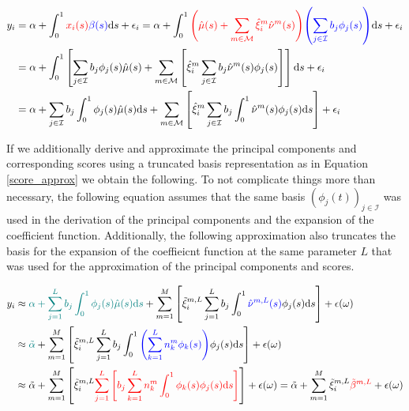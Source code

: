 \documentclass[11pt,twoside,a4paper]{article}
\begin{document}
	\begin{equation}
		\begin{split}
			y_i &= \alpha + \int_{0}^{1} {\color{red}x_i(s)} {\color{blue}\beta(s)} \mathrm{d}s + \epsilon_i
			= \alpha + \int_{0}^{1} {\color{red}\left(\hat{\mu}(s) + \sum_{m \in \mathcal{M}} \hat{\xi}^{m}_i \hat{\nu}^{m}(s)\right)} {\color{blue}\left(\sum_{j \in \mathcal{I}} b_j \phi_j(s)\right)} \mathrm{d}s + \epsilon_i\\
			&= \alpha + \int_{0}^{1} \left[ \sum_{j \in \mathcal{I}} b_j \phi_j(s) \hat{\mu}(s) + \sum_{m \in \mathcal{M}} \left[ \hat{\xi}^m_i \sum_{j \in \mathcal{I}} b_j \hat{\nu}^m(s) \phi_j(s) \right] \right] \mathrm{d}s + \epsilon_i \\
			&= \alpha + \sum_{j \in \mathcal{I}} b_j \int_{0}^{1} \phi_j(s) \hat{\mu}(s) \mathrm{d}s + \sum_{m \in \mathcal{M}} \left[ \hat{\xi}^m_i \sum_{j \in \mathcal{I}} b_j \int_{0}^{1}\hat{\nu}^m(s) \phi_j(s) \mathrm{d}s \right] + \epsilon_i
		\end{split}
	\end{equation}

	If we additionally derive and approximate the principal components and corresponding scores using a truncated basis representation as in Equation \ref{score_approx} we obtain the following. To not complicate things more than necessary, the following equation assumes that the same basis $\left(\phi_j(t)\right)_{j \in \mathcal{I}}$ was used in the derivation of the principal components and the expansion of the coefficient function. Additionally, the following approximation also truncates the basis for the expansion of the coeffieicnt function at the same parameter $L$ that was used for the approximation of the principal components and scores.
	
	\begin{equation}
		\begin{split}
			y_i & \approx {\color{teal}\alpha + \sum_{j = 1}^{L} b_j \int_{0}^{1} \phi_j(s) \hat{\mu}(s) \mathrm{d}s} +  \sum_{m  = 1}^{M} \left[ \tilde{\xi}^{m,L}_{i} \sum_{j = 1}^{L} b_j \int_{0}^{1} {\color{blue}\hat{\nu}^{m,L}(s)} \phi_j(s) \mathrm{d}s \right] + \epsilon(\omega) \\
			& \approx {\color{teal} \tilde{\alpha}} + \sum_{m  = 1}^{M} \left[ \tilde{\xi}^{m,L}_{i} \sum_{j = 1}^{L} b_j \int_{0}^{1}{\color{blue}\left(\sum_{k = 1}^{L} n_{k}^m \phi_{k}(s)\right)} \phi_j(s) \mathrm{d}s \right] + \epsilon(\omega) \\
			& \approx \tilde{\alpha} + \sum_{m  = 1}^{M} \left[ \tilde{\xi}^{m,L}_{i} {\color{red}\sum_{j = 1}^{L} \left[ b_j \sum_{k = 1}^{L} n_{k}^m \int_{0}^{1} \phi_{k}(s) \phi_j(s) \mathrm{d}s \right]} \right]+ \epsilon(\omega)
			= \tilde{\alpha} + \sum_{m  = 1}^{M} \tilde{\xi}^{m,L}_{i} {\color{red}\tilde{\beta}^{m,L}}+ \epsilon(\omega)
		\end{split}
	\end{equation}
\end{document}
